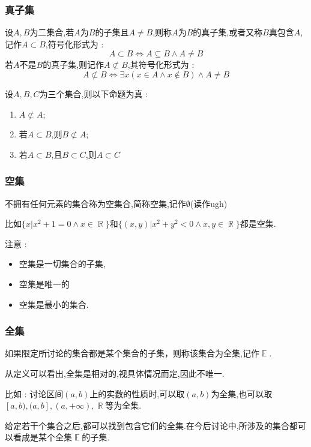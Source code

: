 \documentclass[UTF8,12pt]{ctexbook}
\DeclareMathOperator{\notRealSubset}{\not\subset}
\DeclareMathOperator{\mathRealNumberCollection}{\mathbb{R}}
\DeclareMathOperator{\mathEverythingCollection}{\mathbb{E}}
\begin{document}
{{{{\subsubsection{真子集}{
  设$A,B$为二集合,若$A$为$B$的子集且$A \neq B$,则称$A$为$B$的真子集,或者又称$B$真包含$A$,记作$A \subset B$,符号化形式为 : $$
    A \subset B \Leftrightarrow A \subseteq B \land A \neq B
  $$
  若$A$不是$B$的真子集,则记作$A \notRealSubset B$,其符号化形式为 : $$
    A \notRealSubset B \Leftrightarrow \exists x (x \in A \land x \notin B) \land A \neq B
  $$

  设$A,B,C$为三个集合,则以下命题为真 :

  \begin{enumerate}
    \item $A \notRealSubset A$;
    \item 若$A \subset B$,则$B \notRealSubset A$;
    \item 若$A \subset B$,且$B \subset C$,则$A \subset C$
  \end{enumerate}
}%

\subsubsection{空集}{
  不拥有任何元素的集合称为空集合,简称空集,记作$\emptyset$(读作ugh)

  比如$\{x | x^2 + 1 = 0 \land x \in \mathRealNumberCollection\}$和$\{(x,y) | x^2+y^2 < 0 \land x,y \in \mathRealNumberCollection\}$都是空集.

  注意 :

  \begin{itemize}
    \item 空集是一切集合的子集,
    \item 空集是唯一的
    \item 空集是最小的集合.
  \end{itemize}
}%

\subsubsection{全集}{
  如果限定所讨论的集合都是某个集合的子集，则称该集合为全集,记作$\mathEverythingCollection$.

  从定义可以看出,全集是相对的,视具体情况而定,因此不唯一.

  比如 : 讨论区间$(a,b)$上的实数的性质时,可以取$(a,b)$为全集,也可以取$[a,b),(a,b],(a , +\infty),\mathRealNumberCollection$等为全集.

  给定若干个集合之后,都可以找到包含它们的全集.在今后讨论中,所涉及的集合都可以看成是某个全集$\mathEverythingCollection$的子集.
}%

}}}}
\end{document}
